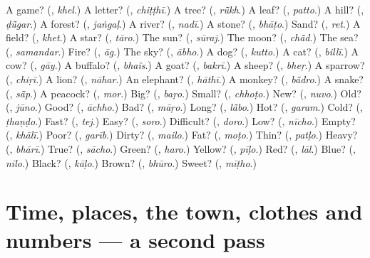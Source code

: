 \begin{tcolorbox}[breakable,colback=teal!4,colframe=teal!35!black,title={Before you move on}]
A game? (\textbf{}, \emph{khel}.) A letter? (\textbf{}, \emph{chiṭṭhī}.) A tree? (\textbf{}, \emph{rū̃kh}.) A leaf? (\textbf{}, \emph{patto}.) A hill? (\textbf{}, \emph{ḍū̃gar}.) A forest? (\textbf{}, \emph{jaṅgaḷ}.) A river? (\textbf{}, \emph{nadī}.) A stone? (\textbf{}, \emph{bhāṭo}.) Sand? (\textbf{}, \emph{ret}.) A field? (\textbf{}, \emph{khet}.) A star? (\textbf{}, \emph{tāro}.) The sun? (\textbf{}, \emph{sūraj}.) The moon? (\textbf{}, \emph{chā̃d}.) The sea? (\textbf{}, \emph{samandar}.) Fire? (\textbf{}, \emph{āg}.) The sky? (\textbf{}, \emph{ābho}.) A dog? (\textbf{}, \emph{kutto}.) A cat? (\textbf{}, \emph{billī}.) A cow? (\textbf{}, \emph{gāy}.) A buffalo? (\textbf{}, \emph{bhaĩs}.) A goat? (\textbf{}, \emph{bakrī}.) A sheep? (\textbf{}, \emph{bheṛ}.) A sparrow? (\textbf{}, \emph{chiṛī}.) A lion? (\textbf{}, \emph{nāhar}.) An elephant? (\textbf{}, \emph{hāthī}.) A monkey? (\textbf{}, \emph{bā̃dro}.) A snake? (\textbf{}, \emph{sā̃p}.) A peacock? (\textbf{}, \emph{mor}.) Big? (\textbf{}, \emph{baṛo}.) Small? (\textbf{}, \emph{chhoṭo}.) New? (\textbf{}, \emph{nuvo}.) Old? (\textbf{}, \emph{jūno}.) Good? (\textbf{}, \emph{āchho}.) Bad? (\textbf{}, \emph{māṛo}.) Long? (\textbf{}, \emph{lā̃bo}.) Hot? (\textbf{}, \emph{garam}.) Cold? (\textbf{}, \emph{ṭhaṇḍo}.) Fast? (\textbf{}, \emph{tej}.) Easy? (\textbf{}, \emph{soro}.) Difficult? (\textbf{}, \emph{doro}.) Low? (\textbf{}, \emph{nīcho}.) Empty? (\textbf{}, \emph{khālī}.) Poor? (\textbf{}, \emph{garīb}.) Dirty? (\textbf{}, \emph{mailo}.) Fat? (\textbf{}, \emph{moṭo}.) Thin? (\textbf{}, \emph{patḷo}.) Heavy? (\textbf{}, \emph{bhārī}.) True? (\textbf{}, \emph{sācho}.) Green? (\textbf{}, \emph{haro}.) Yellow? (\textbf{}, \emph{pīḷo}.) Red? (\textbf{}, \emph{lāl}.) Blue? (\textbf{}, \emph{nīlo}.) Black? (\textbf{}, \emph{kāḷo}.) Brown? (\textbf{}, \emph{bhūro}.) Sweet? (\textbf{}, \emph{mīṭho}.)
\end{tcolorbox}
\section[(dialogue)]{Time, places, the town, clothes and numbers — a second pass}

